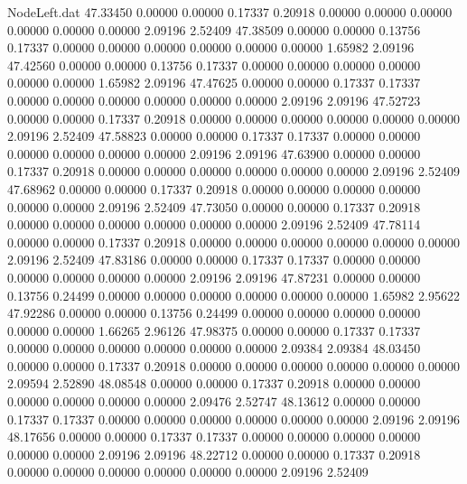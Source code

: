 \begin{filecontents}{NodeLeft.dat}
  47.33450    0.00000    0.00000     0.17337    0.20918    0.00000    0.00000    0.00000    0.00000    0.00000    0.00000    2.09196    2.52409
  47.38509    0.00000    0.00000     0.13756    0.17337    0.00000    0.00000    0.00000    0.00000    0.00000    0.00000    1.65982    2.09196
  47.42560    0.00000    0.00000     0.13756    0.17337    0.00000    0.00000    0.00000    0.00000    0.00000    0.00000    1.65982    2.09196
  47.47625    0.00000    0.00000     0.17337    0.17337    0.00000    0.00000    0.00000    0.00000    0.00000    0.00000    2.09196    2.09196
  47.52723    0.00000    0.00000     0.17337    0.20918    0.00000    0.00000    0.00000    0.00000    0.00000    0.00000    2.09196    2.52409
  47.58823    0.00000    0.00000     0.17337    0.17337    0.00000    0.00000    0.00000    0.00000    0.00000    0.00000    2.09196    2.09196
  47.63900    0.00000    0.00000     0.17337    0.20918    0.00000    0.00000    0.00000    0.00000    0.00000    0.00000    2.09196    2.52409
  47.68962    0.00000    0.00000     0.17337    0.20918    0.00000    0.00000    0.00000    0.00000    0.00000    0.00000    2.09196    2.52409
  47.73050    0.00000    0.00000     0.17337    0.20918    0.00000    0.00000    0.00000    0.00000    0.00000    0.00000    2.09196    2.52409
  47.78114    0.00000    0.00000     0.17337    0.20918    0.00000    0.00000    0.00000    0.00000    0.00000    0.00000    2.09196    2.52409
  47.83186    0.00000    0.00000     0.17337    0.17337    0.00000    0.00000    0.00000    0.00000    0.00000    0.00000    2.09196    2.09196
  47.87231    0.00000    0.00000     0.13756    0.24499    0.00000    0.00000    0.00000    0.00000    0.00000    0.00000    1.65982    2.95622
  47.92286    0.00000    0.00000     0.13756    0.24499    0.00000    0.00000    0.00000    0.00000    0.00000    0.00000    1.66265    2.96126
  47.98375    0.00000    0.00000     0.17337    0.17337    0.00000    0.00000    0.00000    0.00000    0.00000    0.00000    2.09384    2.09384
  48.03450    0.00000    0.00000     0.17337    0.20918    0.00000    0.00000    0.00000    0.00000    0.00000    0.00000    2.09594    2.52890
  48.08548    0.00000    0.00000     0.17337    0.20918    0.00000    0.00000    0.00000    0.00000    0.00000    0.00000    2.09476    2.52747
  48.13612    0.00000    0.00000     0.17337    0.17337    0.00000    0.00000    0.00000    0.00000    0.00000    0.00000    2.09196    2.09196
  48.17656    0.00000    0.00000     0.17337    0.17337    0.00000    0.00000    0.00000    0.00000    0.00000    0.00000    2.09196    2.09196
  48.22712    0.00000    0.00000     0.17337    0.20918    0.00000    0.00000    0.00000    0.00000    0.00000    0.00000    2.09196    2.52409

\end{filecontents}
